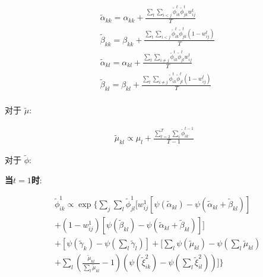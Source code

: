 \begin{equation}
\label{eq6}
\begin{split}
& \widetilde{\alpha}_{kk} = \alpha_{kk} + \frac{\sum_t \sum_{i<j} \widetilde{\phi}_{ik}^t \widetilde{\phi}_{jk}^t w_{ij}^t}{T}  \\
& \widetilde{\beta}_{kk} = \beta_{kk} + \frac{\sum_t \sum_{i<j} \widetilde{\phi}_{ik}^t \widetilde{\phi}_{jk}^t (1-w_{ij}^t)}{T} \\
& \widetilde{\alpha}_{kl} = \alpha_{kl} + \frac{\sum_t \sum_{i \neq j} \widetilde{\phi}_{ik}^t \widetilde{\phi}_{jl}^t w_{ij}^t}{T} \\
& \widetilde{\beta}_{kl} = \beta_{kl} + \frac{\sum_t \sum_{i \neq j} \widetilde{\phi}_{ik}^t \widetilde{\phi}_{jl}^t (1-w_{ij}^t)}{T}  \\
\end{split}
\end{equation}

对于\textbf{ $\widetilde{\mu}$}:

\begin{equation}
\label{eq7}
\begin{split}
\widetilde{\mu}_{kl} \propto \mu_l + \frac{\sum_{t=2}^T \sum_i \widetilde{\phi}_{ik}^{t-1}}{T-1}
\end{split}
\end{equation}

对于 \textbf{$\widetilde{\phi}$}:

\textbf{当$t=1$时}:

\begin{equation}
\label{eq8}
\begin{split}
&\widetilde{\phi}_{ik}^1 \propto \exp\{\sum_j \sum_l \widetilde{\phi}_{jl}^1 [w_{ij}^1[\psi(\widetilde{\alpha}_{kl})-\psi(\widetilde{\alpha}_{kl}+\widetilde{\beta}_{kl})]\\
 &+ (1-w_{ij}^1)[\psi(\widetilde{\beta}_{kl}) - \psi(\widetilde{\alpha}_{kl}+\widetilde{\beta}_{kl})] ]   \\
& +[\psi(\widetilde{\gamma}_k)-\psi(\sum_l \widetilde{\gamma}_l) ] +[\sum_l \psi(\widetilde{\mu}_{kl}) - \psi(\sum_l \widetilde{\mu}_{kl}) \\
&+ \sum_l (\frac{\widetilde{\mu}_{kl}}{\sum_l \widetilde{\mu}_{kl}}-1)(\psi (\widetilde{\xi}_{ik}^2) - \psi(\sum_l \widetilde{\xi}_{il}^2))]  \} \\
\end{split}
\end{equation}

